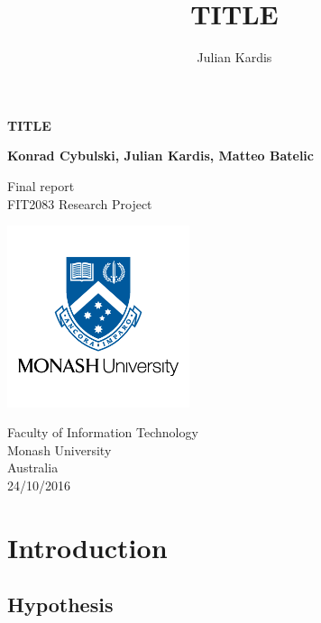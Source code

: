 \documentclass[10pt,a4paper]{article}
\author{Julian Kardis}
\title{TITLE}
\begin{document}
\begin{titlepage}
    \begin{center}
        \vspace*{1cm}
        
        \LARGE
        \textbf{TITLE}
        
        \vspace{2cm}
        
		\Large 
        
        \textbf{Konrad Cybulski, Julian Kardis, Matteo Batelic}
        
        
        \LARGE
        \vspace{2cm}

        
        
        \vfill
        
        
        
        Final report \\
        FIT2083 Research Project
        
        
        \includegraphics[width=0.4\textwidth]{monash-university-logo.png}
              
        
        \large
        Faculty of Information Technology\\
        Monash University\\
        Australia\\
        24/10/2016
        
    \end{center}
\end{titlepage}

\pagebreak
\tableofcontents
\pagebreak


\section{Introduction} 





\subsection{Hypothesis}
\end{document}
